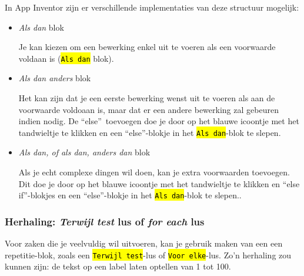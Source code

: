 In App Inventor zijn er verschillende implementaties van deze structuur mogelijk:
\begin{itemize}
	\item \emph{Als dan} blok \\
	\begin{minipage}{.5\linewidth}
	Je kan kiezen om een bewerking enkel uit te voeren als een voorwaarde voldaan is (\hl{\texttt{Als dan}} blok).
	\end{minipage}
	\begin{minipage}{.5\linewidth}
	\end{minipage}	
	\item \emph{Als dan anders} blok \\
	\begin{minipage}{.5\linewidth}
			Het kan zijn dat je een eerste bewerking wenst uit te voeren als aan de voorwaarde voldoaan is, maar dat er een andere bewerking zal gebeuren indien nodig. De \textquotedblleft else\textquotedblright \ toevoegen doe je door op het blauwe icoontje met het tandwieltje te klikken en een \textquotedblleft else\textquotedblright -blokje in het \hl{\texttt{Als dan}}-blok te slepen.
	\end{minipage}
	\begin{minipage}{.5\linewidth}
	\end{minipage}	
	\item \emph{Als dan, of als dan, anders dan} blok \\
	\begin{minipage}{.5\linewidth}
		Als je echt complexe dingen wil doen, kan je extra voorwaarden toevoegen. Dit doe je door op het blauwe icoontje met het tandwieltje te klikken en \textquotedblleft else if\textquotedblright -blokjes en een \textquotedblleft else\textquotedblright -blokje in het \hl{\texttt{Als dan}}-blok te slepen..
	\end{minipage}
	\begin{minipage}{.5\linewidth}
	\end{minipage}	
\end{itemize}

\subsubsection{Herhaling: \emph{Terwijl test} lus of \emph{for each} lus}

Voor zaken die je veelvuldig wil uitvoeren, kan je gebruik maken van een een repetitie-blok, zoals een \hl{\texttt{Terwijl test}}-lus of \hl{\texttt{Voor elke}}-lus. 
Zo'n herhaling zou kunnen zijn: de tekst op een label laten optellen van 1 tot 100.


